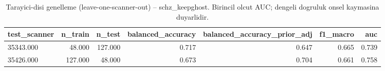 \begin{table}[htbp]
  \centering
  \caption{Tarayici-disi genelleme (leave-one-scanner-out) -- schz\_keepghost. Birincil olcut AUC; dengeli dogruluk onsel kaymasina duyarlidir.}
  \label{tab:loso_schz_keepghost}
  \small
  \begin{tabular}{lrrrrrr}
    \toprule
    test\_scanner & n\_train & n\_test & balanced\_accuracy & balanced\_accuracy\_prior\_adj & f1\_macro & auc \\
    \midrule
    35343.000 & 48.000 & 127.000 & 0.717 & 0.647 & 0.665 & 0.739 \\
    35426.000 & 127.000 & 48.000 & 0.673 & 0.704 & 0.661 & 0.758 \\
    \bottomrule
  \end{tabular}
\end{table}
